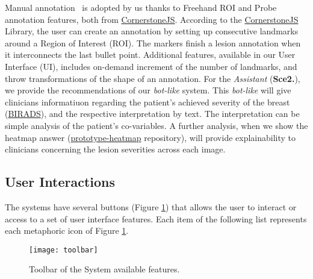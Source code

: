 \hfill


Manual annotation~ is adopted by us thanks to Freehand ROI and Probe annotation features, both from \hyperlink{https://cornerstonejs.org/}{CornerstoneJS}. According to the \hyperlink{https://cornerstonejs.org/}{CornerstoneJS} Library, the user can create an annotation by setting up consecutive landmarks around a Region of Interest (ROI). The markers finish a lesion annotation when it interconnects the last bullet point. Additional features, available in our User Interface (UI), includes on-demand increment of the number of landmarks, and throw transformations of the shape of an annotation. For the \textit{Assistant} (\textbf{Sce2.}), we provide the recommendations of our \textit{bot-like} system. This \textit{bot-like} will give clinicians informatiuon regarding the patient's achieved severity of the breast (\hyperlink{https://en.wikipedia.org/wiki/BI-RADS}{BIRADS}), and the respective interpretation by text. The interpretation can be simple analysis of the patient's co-variables. A further analysis, when we show the heatmap answer (\hyperlink{https://github.com/mida-project/prototype-heatmap}{prototype-heatmap} repository), will provide explainability to clinicians concerning the lesion severities across each image.

\clearpage


\subsection{User Interactions}

The systems have several buttons (Figure \ref{fig:toolbar}) that allows the user to interact or access to a set of user interface features. Each item of the following list represents each metaphoric icon of Figure \ref{fig:toolbar}.


\hfill

\begin{figure}[h]
\centering
\texttt{[image: toolbar]}
\caption{Toolbar of the System available features.}
\label{fig:toolbar}
\end{figure}

